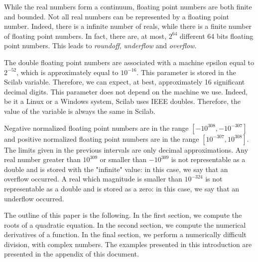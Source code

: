 While the real numbers form a continuum, floating point numbers 
are both finite and bounded. Not all real numbers can be represented by a floating point number.
Indeed, there is a infinite number of reals, while there is a finite 
number of floating point numbers. 
In fact, there are, at most, $2^{64}$ different 64 bits floating point numbers. 
This leads to \emph{roundoff}, \emph{underflow} and \emph{overflow}.

The double floating point numbers are associated with a machine epsilon equal to $2^{-52}$,
which is approximately equal to $10^{-16}$. This parameter is 
stored in the  Scilab variable. Therefore, we can expect, at best, 
approximately 16 significant decimal digits. 
This parameter does not depend on the machine we use. Indeed, be it a Linux or a Windows system,
Scilab uses IEEE doubles. Therefore, the value of the  variable is always the same
in Scilab.

Negative normalized floating point numbers are in the 
range $[-10^{308},-10^{-307}]$ and positive normalized floating point numbers are in the 
range $[10^{-307},10^{308}]$. The limits given in the previous intervals 
are only decimal approximations. Any real number greater than $10^{309}$
or smaller than $-10^{309}$ is not representable as a double and is stored with the 
"infinite" value: in this case, we say that an overflow occurred. 
A real which magnitude is smaller than $10^{-324}$ is not representable as a 
double and is stored as a zero: in this case, we say that an underflow occurred.

The outline of this paper is the following. In the first section,
we compute the roots of a quadratic equation. In the second section,
we compute the numerical derivatives of a function. In the final section,
we perform a numerically difficult division, with complex numbers.
The examples presented in this introduction are presented in the 
appendix of this document.


